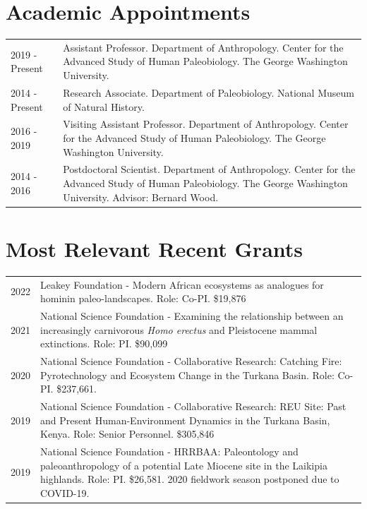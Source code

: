 \documentclass{article}
\begin{document}
\section*{Academic Appointments}
\begin{tabular}{p{}p{}}
2019 - Present & Assistant Professor. Department of Anthropology. Center for the Advanced Study of Human Paleobiology. The George Washington University.\\[4pt]
2014 - Present & Research Associate. Department of Paleobiology.  National Museum of Natural History.\\[4pt]
2016 - 2019 & Visiting Assistant Professor. Department of Anthropology. Center for the Advanced Study of Human Paleobiology. The George Washington University.\\[4pt]
2014 - 2016 & Postdoctoral Scientist. Department of Anthropology. Center for the Advanced Study of Human Paleobiology. The George Washington University. Advisor: Bernard Wood.\\[4pt]
\end{tabular} 




\section*{Most Relevant Recent Grants}
\begin{tabular}{p{}p{}}
2022 & Leakey Foundation - Modern African ecosystems as analogues for hominin paleo-landscapes. Role: Co-PI. \$19,876\\[4pt]
2021 & National Science Foundation - Examining the relationship between an increasingly carnivorous \emph{Homo erectus} and Pleistocene mammal extinctions. Role: PI. \$90,099\\[4pt]
2020 & National Science Foundation - Collaborative Research: Catching Fire: Pyrotechnology and Ecosystem Change in the Turkana Basin. Role: Co-PI. \$237,661.\\[4pt]
2019 &  National Science Foundation - Collaborative Research: REU Site: Past and Present Human-Environment Dynamics in the Turkana Basin, Kenya. Role: Senior Personnel. \$305,846\\[4pt]
2019 & National Science Foundation - HRRBAA: Paleontology and paleoanthropology of a potential Late Miocene site in the Laikipia highlands. Role: PI. \$26,581. 2020 fieldwork season postponed due to COVID-19. \\[4pt]


\end{tabular}
\end{document}
